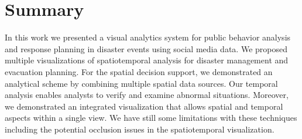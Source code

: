 \section{Summary}
\label{sec:conclusions}
%
In this work we presented a visual analytics system for public behavior analysis and response planning in disaster events using social media data.
We proposed multiple visualizations of spatiotemporal analysis for disaster management and evacuation planning.
For the spatial decision support, we demonstrated an analytical scheme by combining multiple spatial data sources.
Our temporal analysis enables analysts to verify and examine abnormal situations.
Moreover, we demonstrated an integrated visualization that allows spatial and temporal aspects within a single view.
We have still some limitations with these techniques including the potential occlusion issues in the spatiotemporal visualization.
